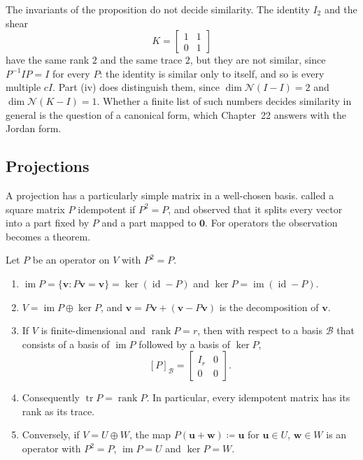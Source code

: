 The invariants of the proposition do not decide similarity. The identity $I_2$ and the shear
\[
K=\begin{bmatrix}1&1\\0&1\end{bmatrix}
\]
have the same rank $2$ and the same trace $2$, but they are not similar, since $P^{-1}IP=I$ for every $P$: the identity is similar only to itself, and so is every multiple $cI$. Part (iv) does distinguish them, since $\dim\mathcal N(I-I)=2$ and $\dim\mathcal N(K-I)=1$. Whether a finite list of such numbers decides similarity in general is the question of a canonical form, which Chapter~22 answers with the Jordan form.

\subsection{Projections}

A projection has a particularly simple matrix in a well-chosen basis.  called a square matrix $P$ idempotent if $P^2=P$, and observed that it splits every vector into a part fixed by $P$ and a part mapped to $\mathbf 0$. For operators the observation becomes a theorem.

\begin{proposition}[Projections]
\label{prop:projection}
Let $P$ be an operator on $V$ with $P^2=P$.
\begin{enumerate}
\item $\operatorname{im}P=\{\mathbf v: P\mathbf v=\mathbf v\}=\ker(\operatorname{id}-P)$ and $\ker P=\operatorname{im}(\operatorname{id}-P)$.
\item $V=\operatorname{im}P\oplus\ker P$, and $\mathbf v=P\mathbf v+(\mathbf v-P\mathbf v)$ is the decomposition of $\mathbf v$.
\item If $V$ is finite-dimensional and $\operatorname{rank}P=r$, then with respect to a basis $\mathcal B$ that consists of a basis of $\operatorname{im}P$ followed by a basis of $\ker P$,
\[
[P]_{\mathcal B}=\begin{bmatrix}I_r&0\\0&0\end{bmatrix}.
\]
\item Consequently $\operatorname{tr}P=\operatorname{rank}P$. In particular, every idempotent matrix has its rank as its trace.
\item Conversely, if $V=U\oplus W$, the map $P(\mathbf u+\mathbf w)\coloneqq\mathbf u$ for $\mathbf u\in U$, $\mathbf w\in W$ is an operator with $P^2=P$, $\operatorname{im}P=U$ and $\ker P=W$.
\end{enumerate}
\end{proposition}

